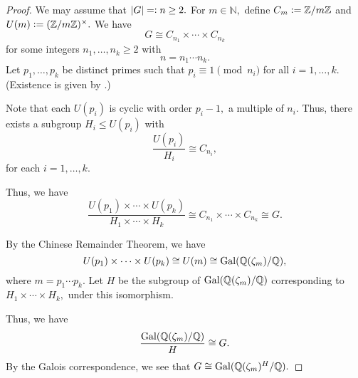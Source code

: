 \fingroupQextension*\label{thm:fingroupQextension2}
\begin{flushright}\hyperref[thm:fingroupQextension]{\upsym}\end{flushright}
\begin{proof}
    We may assume that ${\left\lvert G \right\lvert} =\vcentcolon n \ge 2.$ For $m \in \mathbb{N},$ define $C_m \vcentcolon= \mathbb{Z}/m\mathbb{Z}$ and $U(m) \vcentcolon= (\mathbb{Z}/m\mathbb{Z})^\times.$ We have
    \begin{equation*} 
        G \cong C_{n_1} \times \cdots \times C_{n_k}
    \end{equation*}
    for some integers $n_1, \ldots, n_k \ge 2$ with
    \begin{equation*} 
        n = n_1 \cdots n_k.
    \end{equation*}
    Let $p_1, \ldots, p_k$ be distinct primes such that $p_i \equiv 1 \pmod{n_i}$ for all $i = 1, \ldots, k.$ (Existence is given by .)

    Note that each $U(p_i)$ is cyclic with order $p_i - 1,$ a multiple of $n_i.$ Thus, there exists a subgroup $H_i \le U(p_i)$ with
    \begin{equation*} 
        \frac{U(p_i)}{H_i} \cong C_{n_i},
    \end{equation*}
    for each $i = 1, \ldots, k.$

    Thus, we have 
    \begin{equation*} 
        \frac{U(p_1) \times \cdots \times U(p_k)}{H_1 \times \cdots \times H_k} \cong C_{n_1} \times \cdots \times C_{n_k} \cong G.
    \end{equation*}

    By the Chinese Remainder Theorem, we have 
    \begin{equation*} 
        U(p_1) \times \cdots \times U(p_k) \cong U(m) \cong \operatorname{Gal}(\mathbb{Q}(\zeta_m)/\mathbb{Q}),
    \end{equation*} 
    where $m = p_1 \cdots p_k.$ Let $H$ be the subgroup of $\operatorname{Gal}(\mathbb{Q}(\zeta_m)/\mathbb{Q})$ corresponding to $H_1 \times \cdots \times H_k,$ under this isomorphism.

    Thus, we have
    \begin{equation*} 
        \frac{\operatorname{Gal}(\mathbb{Q}(\zeta_m)/\mathbb{Q})}{H} \cong G.
    \end{equation*}
    By the Galois correspondence, we see that $G \cong \operatorname{Gal}(\mathbb{Q}(\zeta_m)^H/\mathbb{Q}).$
\end{proof}

